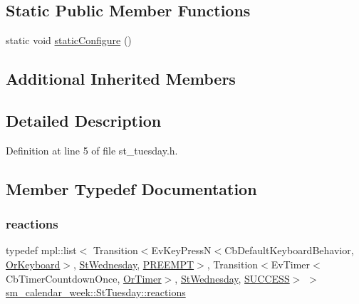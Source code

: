 \subsection*{Static Public Member Functions}
\begin{DoxyCompactItemize}
\item 
static void \hyperlink{structsm__calendar__week_1_1StTuesday_a1d0e3568187fa9cfd3181e2c951e8856}{static\+Configure} ()
\end{DoxyCompactItemize}
\subsection*{Additional Inherited Members}


\subsection{Detailed Description}


Definition at line 5 of file st\+\_\+tuesday.\+h.



\subsection{Member Typedef Documentation}
\mbox{\label{structsm__calendar__week_1_1StTuesday_a8761617f08711bc2ba2e3b051c2b5337}} 
\subsubsection{\texorpdfstring{reactions}{reactions}}
{\footnotesize\ttfamily typedef mpl\+::list$<$ Transition$<$Ev\+Key\+PressN$<$Cb\+Default\+Keyboard\+Behavior, \hyperlink{classsm__calendar__week_1_1OrKeyboard}{Or\+Keyboard}$>$, \hyperlink{structsm__calendar__week_1_1StWednesday}{St\+Wednesday}, \hyperlink{classPREEMPT}{P\+R\+E\+E\+M\+PT}$>$, Transition$<$Ev\+Timer$<$Cb\+Timer\+Countdown\+Once, \hyperlink{classsm__calendar__week_1_1OrTimer}{Or\+Timer}$>$, \hyperlink{structsm__calendar__week_1_1StWednesday}{St\+Wednesday}, \hyperlink{classSUCCESS}{S\+U\+C\+C\+E\+SS}$>$ $>$ \hyperlink{structsm__calendar__week_1_1StTuesday_a8761617f08711bc2ba2e3b051c2b5337}{sm\+\_\+calendar\+\_\+week\+::\+St\+Tuesday\+::reactions}}



